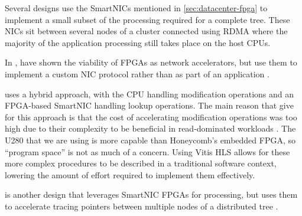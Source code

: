 

Several designs \autocite{honeycomb,strom,star} use the SmartNICs mentioned in
\ref{sec:datacenter-fpga} to implement a small subset of the processing required
for a complete tree. These NICs sit between several nodes of a cluster connected
using RDMA where the majority of the application processing still takes place on
the host CPUs.

In , \citeauthor{star} have shown the viability of FPGAs as
network accelerators, but use them to implement a custom NIC protocol rather
than as part of an application \autocite{star}.


 uses a hybrid approach, with the CPU handling modification
operations and an FPGA-based SmartNIC handling lookup operations. The main
reason that \citeauthor{honeycomb} give for this approach is that the cost of
accelerating modification operations was too high due to their complexity to be
beneficial in read-dominated workloads \autocite{honeycomb}. The U280 that we
are using is more capable than Honeycomb's embedded FPGA, so ``program space''
is not as much of a concern. Using Vitis HLS allows for these more complex
procedures to be described in a traditional software context, lowering the
amount of effort required to implement them effectively.

 is another design that leverages SmartNIC FPGAs for
processing, but uses them to accelerate tracing pointers between multiple nodes
of a distributed tree \autocite{strom}.
